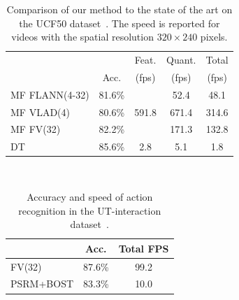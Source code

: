 \documentclass[10pt,twocolumn,letterpaper]{article}
\begin{document}
\begin{table}
\begin{center}
\begin{tabular}{|l|c|c|c|c|}
\hline
		 				&  	 	& Feat.                    & Quant. 	& Total	\\
		 				& Acc.  & (fps)                    & (fps) 	& (fps)	\\\hline
MF FLANN(4-32)	& 81.6\% & \multirow{3}{*}{591.8}   & 52.4  	& 48.1	\\ %
MF VLAD(4) 	 	& 80.6\% &                          & 671.4 	& 314.6	\\ %
MF FV(32)	 		& 82.2\% &                          & 171.3 	& 132.8	\\ %
\hline
DT \cite{Wang12}& 85.6\% & 2.8            	        & 5.1  	& 1.8\\\hline%
\end{tabular}
\smallskip
\caption{Comparison of our method to the state of the art on the UCF50 dataset~\cite{Reddy12}. The speed is reported for videos with the spatial resolution $320\times 240$ pixels.}
\label{tab:ucf_comparison}
\mbox{}\vspace{-1cm}\\
\end{center}
\end{table}


\begin{table}
\begin{center}
\begin{tabular}{|l|c|c|}
\hline
								& Acc.		& Total FPS	\\\hline
FV(32)						& 87.6\%		& 99.2		\\\hline
PSRM+BOST\cite{Yu10}	& 83.3\%		& 10.0 		\\\hline

\end{tabular}
\mbox{}\vspace{.2cm}\\
\caption{Accuracy and speed of action recognition in the UT-interaction dataset~\cite{Ryoo10}.\vspace{-.6cm}}
\label{tab:uti_comparison}
\end{center}
\end{table}
\end{document}

